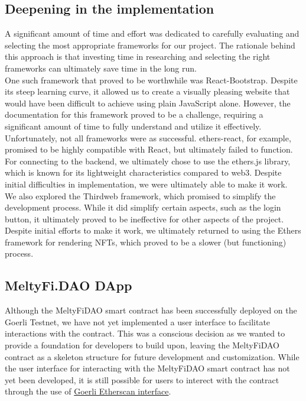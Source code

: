 \subsection{Deepening in the implementation}
A significant amount of time and effort was dedicated to carefully evaluating and selecting the most appropriate frameworks for our project. The rationale behind this approach is that investing time in researching and selecting the right frameworks can ultimately save time in the long run.
\\
\indent One such framework that proved to be worthwhile was React-Bootstrap. Despite its steep learning curve, it allowed us to create a visually pleasing website that would have been difficult to achieve using plain JavaScript alone. However, the documentation for this framework proved to be a challenge, requiring a significant amount of time to fully understand and utilize it effectively.
\\
\indent Unfortunately, not all frameworks were as successful. ethers-react, for example, promised to be highly compatible with React, but ultimately failed to function. For connecting to the backend, we ultimately chose to use the ethers.js library, which is known for its lightweight characteristics compared to web3. Despite initial difficulties in implementation, we were ultimately able to make it work.
\\
\indent We also explored the Thirdweb framework, which promised to simplify the development process. While it did simplify certain aspects, such as the login button, it ultimately proved to be ineffective for other aspects of the project. Despite initial efforts to make it work, we ultimately returned to using the Ethers framework for rendering NFTs, which proved to be a slower (but functioning) process.

\subsection{MeltyFi.DAO DApp}
Although the MeltyFiDAO smart contract has been successfully deployed on the Goerli Testnet, we have not yet implemented a user interface to facilitate interactions with the contract. This was a conscious decision as we wanted to provide a foundation for developers to build upon, leaving the MeltyFiDAO contract as a skeleton structure for future development and customization.
While the user interface for interacting with the MeltyFiDAO smart contract has not yet been developed, it is still possible for users to interect with the contract through the use of \href{https://goerli.etherscan.io/address/0xC4AA65a48fd317070F1A5aC5eBAC70F9d022Fb1e#writeContract}{Goerli Etherscan interface}.